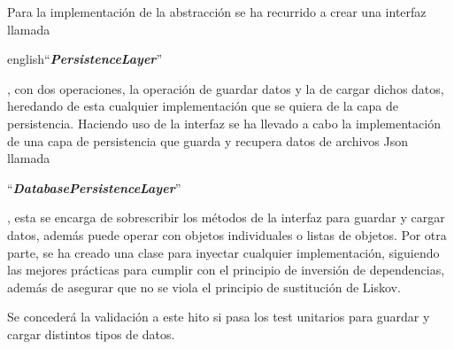 Para la implementación de la abstracción se ha recurrido a crear una interfaz llamada 
\begin{otherlanguage} {english}``\textit{\textbf{PersistenceLayer}}''\end{otherlanguage}, 
con dos operaciones, la operación de guardar datos y la de cargar dichos datos, heredando de esta cualquier 
implementación que se quiera de la capa de persistencia.
Haciendo uso de la interfaz se ha llevado a cabo la implementación de una capa de persistencia que guarda y recupera 
datos de archivos Json llamada \begin{otherlanguage}{english}``\textit{\textbf{DatabasePersistenceLayer}}''\end{otherlanguage}
, esta se encarga de sobrescribir los métodos de la interfaz para guardar y cargar datos, además puede operar con 
objetos individuales o listas de objetos. Por otra parte, se ha creado una clase para inyectar cualquier 
implementación, siguiendo las mejores prácticas para cumplir con el principio de inversión de dependencias, además de 
asegurar que no se viola el principio de sustitución de Liskov. 

Se concederá la validación a este hito si pasa los test unitarios para guardar y cargar distintos tipos de datos.